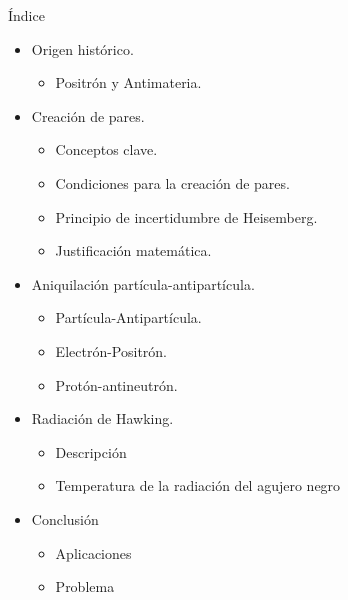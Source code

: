 \documentclass{beamer}
\begin{document}
\begin{frame}{Índice}

\begin{itemize}
  \item Origen histórico.
  \begin{itemize}
      \item Positrón y Antimateria.
      
  \end{itemize}
  
  \item Creación de pares.
  \begin{itemize}
      \item Conceptos clave.
      \item Condiciones para la creación de pares.
      \item Principio de incertidumbre de Heisemberg.
      \item Justificación matemática.
  \end{itemize}
  \item Aniquilación partícula-antipartícula.
  \begin{itemize}
      \item Part\'icula-Antipart\'icula.
      \item Electrón-Positrón.
      \item Protón-antineutrón.
  \end{itemize}
    \item Radiación de Hawking.
  \begin{itemize}
      \item Descripci\'on
      \item Temperatura de la radiación del agujero negro
  \end{itemize}
   \item Conclusión
        \begin{itemize}
            \item Aplicaciones
            \item Problema
        \end{itemize}
\end{itemize}


\end{frame}
\end{document}
